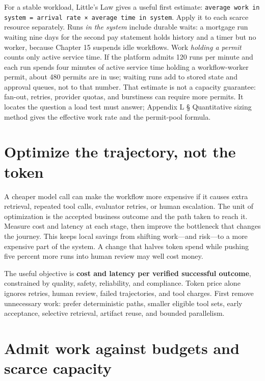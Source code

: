 For a stable workload, Little’s Law gives a useful first estimate: \lstinline[style=bookinline]!average work in system = arrival rate × average time in system!. Apply it to each scarce resource separately. Runs \emph{in the system} include durable waits: a mortgage run waiting nine days for the second pay statement holds history and a timer but no worker, because Chapter 15 suspends idle workflows. Work \emph{holding a permit} counts only active service time. If the platform admits 120 runs per minute and each run spends four minutes of active service time holding a workflow-worker permit, about 480 permits are in use; waiting runs add to stored state and approval queues, not to that number. That estimate is not a capacity guarantee: fan-out, retries, provider quotas, and burstiness can require more permits. It locates the question a load test must answer; Appendix L § Quantitative sizing method gives the effective work rate and the permit-pool formula.\par

\section{Optimize the trajectory, not the token}

A cheaper model call can make the workflow more expensive if it causes extra retrieval, repeated tool calls, evaluator retries, or human escalation. The unit of optimization is the accepted business outcome and the path taken to reach it. Measure cost and latency at each stage, then improve the bottleneck that changes the journey. This keeps local savings from shifting work—and risk—to a more expensive part of the system. A change that halves token spend while pushing five percent more runs into human review may well cost money.\par

The useful objective is \textbf{cost and latency per verified successful outcome}, constrained by quality, safety, reliability, and compliance. Token price alone ignores retries, human review, failed trajectories, and tool charges. First remove unnecessary work: prefer deterministic paths, smaller eligible tool sets, early acceptance, selective retrieval, artifact reuse, and bounded parallelism.\par

\section{Admit work against budgets and scarce capacity}

